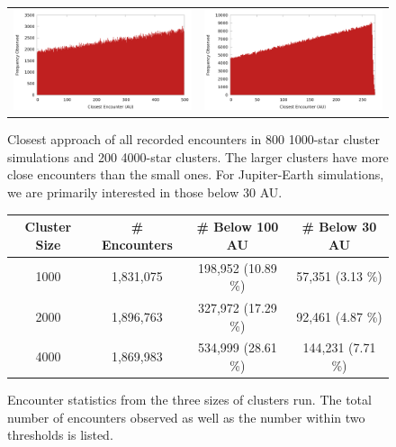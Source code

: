 \documentclass[12pt]{article}
\begin{document}
    \begin{figure}[H]
        \centering
        \caption{Closest approach of all recorded encounters in 800 1000-star cluster 
            simulations and 200 4000-star clusters. The larger clusters have more close
            encounters than the small ones.
            For Jupiter-Earth simulations, we are primarily interested in 
            those below 30 AU. 
        }
        \label{fig:encounter_distance}
        \begin{tabular}{cc}
            \includegraphics[width=3.25in]{encounter_distance_frequency_n1000} &
            \includegraphics[width=3.25in]{encounter_distance_frequency_n4000}
        \end{tabular}
    \end{figure}

    \begin{figure}[H]
        \centering
        \caption{Encounter statistics from the three sizes of clusters run.
            The total number of encounters observed as well as the number within
            two thresholds is listed.}

        \begin{tabular}{|cccc|}
            \hline
            \textbf{Cluster Size} & \textbf{\# Encounters} & \textbf{\# Below 100 AU} 
                & \textbf{\# Below 30 AU} \\
            \hline
            1000 & 1,831,075 & 198,952 (10.89 \%) & 57,351 (3.13 \%) \\
            2000 & 1,896,763 & 327,972 (17.29 \%) & 92,461 (4.87 \%) \\
            4000 & 1,869,983 & 534,999 (28.61 \%) & 144,231 (7.71 \%) \\
            \hline
        \end{tabular}
    \end{figure}
\end{document}

